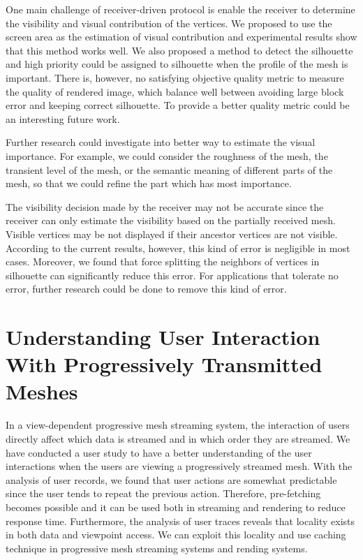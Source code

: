One main challenge of receiver-driven protocol is enable the receiver
to determine the visibility and visual contribution of the vertices.
We proposed to use the screen area as the estimation of visual contribution and 
experimental results show that this method works well. 
We also proposed a method
to detect the silhouette and high priority could be assigned to silhouette when the
profile of the mesh is important. 
There is, however, no satisfying objective quality metric to measure the quality
of rendered image, which balance well between avoiding large block error and 
keeping correct silhouette. To provide a better quality metric could be an interesting 
future work. 

Further research could investigate into better way to estimate the visual importance.
For example, we could consider the roughness of the mesh, the transient level of the mesh,
or the semantic meaning of different parts of the mesh, so that we could refine 
the part which has most importance.

The visibility decision made by the receiver may not be accurate 
since the receiver can only estimate the visibility based on
the partially received mesh. 
Visible vertices may be not displayed if their ancestor vertices are not visible. 
According to the current results, however, this kind of error is negligible in most cases. 
Moreover, we found that force splitting the neighbors of vertices in silhouette can significantly reduce this error.
For applications that tolerate no error, 
further research could be done to remove this kind of error. 

\section{Understanding User Interaction With Progressively Transmitted Meshes} 
In a view-dependent progressive mesh streaming system, the interaction of users directly
affect which data is streamed and in which order they are streamed.
We have conducted a user study to have a better understanding of the user interactions when the users are 
viewing a progressively streamed mesh.
With the analysis of user records, we found that user actions are 
somewhat predictable since the user tends to repeat the previous 
action. 
Therefore, pre-fetching becomes possible and it can be used both in streaming and rendering to
reduce response time.
Furthermore, the analysis of user traces reveals that locality exists in both data and viewpoint access. 
We can exploit this locality and use caching technique in progressive mesh streaming systems and rending systems.

